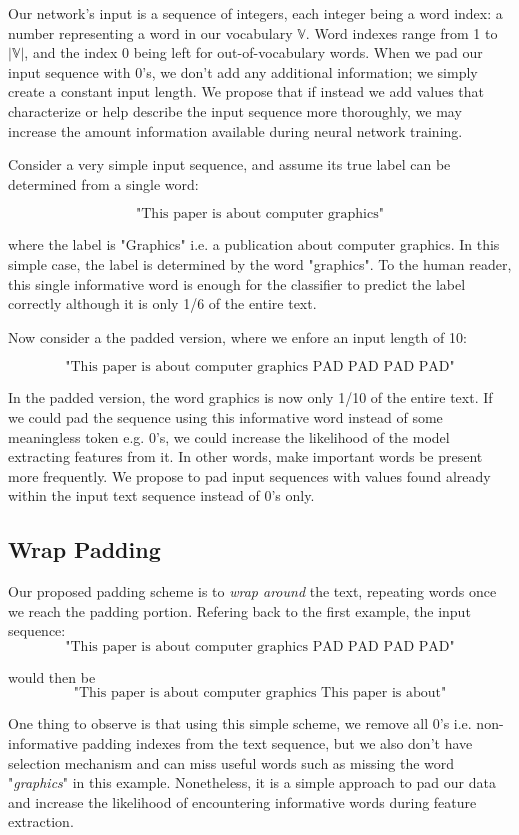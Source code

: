 Our network's input is a sequence of integers, each integer being a word index: a number representing a word in our vocabulary $\mathbb{V}$.
Word indexes range from 1 to $|\mathbb{V}|$, and the index 0 being left for out-of-vocabulary words.
When we pad our input sequence with 0’s, we don’t add any additional information; we
simply create a constant input length. We propose that if instead we add values that characterize or help
describe the input sequence more thoroughly, we may increase the amount information available during neural network training.

Consider a very simple input sequence, and assume its true label can be determined
from a single word:

\[\text{"This paper is about computer graphics"}\]

where the label is "Graphics" i.e. a publication about computer graphics.
In this simple case, the label is determined by the word "graphics". To the human reader, this single informative word
is enough for the classifier to predict the label correctly although it is only 1/6 of the entire text.

Now consider a the padded version, where we enfore an input length of 10:

\[\text{"This paper is about computer graphics PAD PAD PAD PAD"}\]

In the padded version, the word graphics is now only 1/10 of the entire text. If we
could pad the sequence using this informative word instead of some
meaningless token e.g. 0's, we could increase the likelihood of the model extracting features from it. In other
words, make important words be present more frequently.
We propose to pad input sequences with values found already within the
input text sequence instead of 0's only.

\subsection{Wrap Padding}
Our proposed padding scheme is to \textit{wrap around} the text, repeating words once we reach the padding portion.
Refering back to the first example, the input sequence:
\[\text{"This paper is about computer graphics PAD PAD PAD PAD"}\]

would then be
\[\text{"This paper is about computer graphics This paper is about"}\]

One thing to observe is that using this simple scheme, we remove all 0's i.e. non-informative padding indexes
from the text sequence, but we also don't have selection mechanism and can miss useful words such as missing the
word "\textit{graphics}" in this example. Nonetheless, it is a simple approach to pad our data and increase the likelihood of encountering informative
words during feature extraction.



